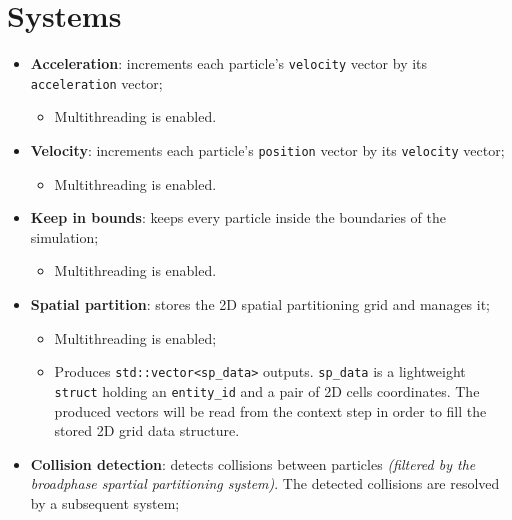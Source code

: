 \documentclass[twoside, 12pt, a4paper, openright]{book}
\providecommand{\tightlist}{%
  \setlength{\itemsep}{0pt}\setlength{\parskip}{0pt}}
\begin{document}
\section{Systems}\label{systems}

\begin{itemize}
\item
  \textbf{Acceleration}: increments each particle's
  \texttt{velocity}
  vector by its
  \texttt{acceleration}
  vector;

  \begin{itemize}
  \tightlist
  \item
    Multithreading is enabled.
  \end{itemize}
\item
  \textbf{Velocity}: increments each particle's
  \texttt{position}
  vector by its
  \texttt{velocity}
  vector;

  \begin{itemize}
  \tightlist
  \item
    Multithreading is enabled.
  \end{itemize}
\item
  \textbf{Keep in bounds}: keeps every particle inside the boundaries of
  the simulation;

  \begin{itemize}
  \tightlist
  \item
    Multithreading is enabled.
  \end{itemize}
\item
  \textbf{Spatial partition}: stores the 2D spatial partitioning grid
  and manages it;

  \begin{itemize}
  \item
    Multithreading is enabled;
  \item
    Produces
    \texttt{std::vector<sp_data>}
    outputs.
    \texttt{sp_data}
    is a lightweight
    \texttt{struct}
    holding an
    \texttt{entity_id}
    and a pair of 2D cells coordinates. The produced vectors will be
    read from the context step in order to fill the stored 2D grid data
    structure.
  \end{itemize}
\item
  \textbf{Collision detection}: detects collisions between particles
  \emph{(filtered by the broadphase spartial partitioning system)}. The
  detected collisions are resolved by a subsequent system;


\end{itemize}
\end{document}
